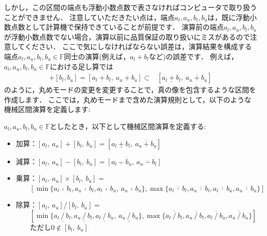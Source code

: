 しかし，この区間の端点も浮動小数点数で表さなければコンピュータで取り扱うことができません．
注意していただきたい点は，端点$a_l, a_u, b_l, b_u$は，既に浮動小数点数として計算機で保持できていることが前提です．
演算前の端点$a_l, a_u, b_l, b_u$が浮動小数点数でない場合，演算以前に品質保証の取り扱いにミスがあるので注意してください．
ここで気にしなければならない誤差は，演算結果を構成する端点$a_l, a_u, b_l, b_u \in {\mathbb F}$同士の演算(例えば，$a_l + b_l$など)の誤差です．
例えば，$a_l, a_u, b_l, b_u \in {\mathbb F}$における足し算では
\begin{align*}
	[a_l, a_u] + [b_l, b_u] = [a_l + b_l, \ a_u + b_u] \subset& [a_l ~ \underline{+} ~ b_l, \ a_u ~ \overline{+} ~ b_u]
\end{align*}
のように，丸めモードの変更を変更することで，真の像を包含するような区間を作成します．
ここでは，丸めモードまで含めた演算規則として，以下のような機械区間演算を定義します:

\begin{defi}[機械区間演算]\label{def:round_interval}
$a_l, a_u, b_l, b_u \in {\mathbb F}$としたとき，以下として機械区間演算を定義する:
\begin{itemize}
	\item 加算：$[a_l,\ a_u]+[b_l,\ b_u] = [a_l ~ \underline{+} ~ b_l,\ a_u ~ \overline{+} ~ b_u]$
	\item 減算：$[a_l,\ a_u]-[b_l,\ b_u] = [a_l ~ \underline{-} ~ b_u,\ a_u ~ \overline{-} ~ b_l]$
	
	\item 乗算：$ [a_l,\ a_u]\times[b_l,\ b_u] = $\\
	$ ~~~~~~~~~ [\min \{ a_l ~ \underline{\cdot} ~ b_l, a_u ~ \underline{\cdot} ~ b_l, a_l ~ \underline{\cdot} ~ b_u,\ a_u ~ \underline{\cdot} ~ b_u \}, \max \{ a_l ~ \overline{\cdot} ~ b_l, a_u ~ \overline{\cdot} ~ b_l, a_l ~ \overline{\cdot} ~ b_u, a_u ~ \overline{\cdot} ~ b_u \}]$
	\item 除算：$ [a_l,\ a_u]/[b_l,\ b_u]= $\\
	$ ~~~~~~~~~ [\min \{ a_l ~ \underline{/} ~ b_l, a_u ~ \underline{/} ~ b_l, a_l ~ \underline{/} ~ b_u,\ a_u ~ \underline{/} ~ b_u \}, \max \{ a_l ~ \overline{/} ~ b_l, a_u ~ \overline{/} ~ b_l, a_l ~ \overline{/} ~ b_u, a_u ~ \overline{/} ~ b_u \}]$\\
	$ ~~~~~~~~~ $ただし$0 \notin [b_l,\ b_u]$
\end{itemize}
\end{defi}

